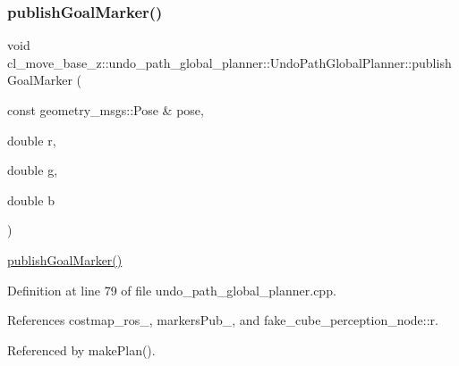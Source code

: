 \subsubsection{\texorpdfstring{publish\+Goal\+Marker()}{publishGoalMarker()}}
{\footnotesize\ttfamily void cl\+\_\+move\+\_\+base\+\_\+z\+::undo\+\_\+path\+\_\+global\+\_\+planner\+::\+Undo\+Path\+Global\+Planner\+::publish\+Goal\+Marker (\begin{DoxyParamCaption}\item[{const geometry\+\_\+msgs\+::\+Pose \&}]{pose,  }\item[{double}]{r,  }\item[{double}]{g,  }\item[{double}]{b }\end{DoxyParamCaption})\hspace{0.3cm}{\ttfamily [private]}}

\hyperlink{classcl__move__base__z_1_1undo__path__global__planner_1_1UndoPathGlobalPlanner_a37a85e1cd57173902d8302cb8cb9b933}{publish\+Goal\+Marker()} 

Definition at line 79 of file undo\+\_\+path\+\_\+global\+\_\+planner.\+cpp.



References costmap\+\_\+ros\+\_\+, markers\+Pub\+\_\+, and fake\+\_\+cube\+\_\+perception\+\_\+node\+::r.



Referenced by make\+Plan().


